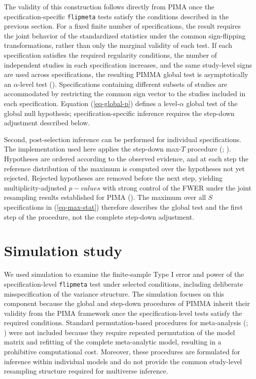 \documentclass[
  man,
  longtable,
  nolmodern,
  notxfonts,
  notimes,
  colorlinks=true,linkcolor=blue,citecolor=blue,urlcolor=blue]{apa7}
\begin{document}
The validity of this construction follows directly from PIMA once the
specification-specific \texttt{flipmeta} tests satisfy the conditions
described in the previous section. For a fixed finite number of
specifications, the result requires the joint behavior of the
standardized statistics under the common sign-flipping transformations,
rather than only the marginal validity of each test. If each
specification satisfies the required regularity conditions, the number
of independent studies in each specification increases, and the same
study-level signs are used across specifications, the resulting PIMMA
global test is asymptotically an \(\alpha\)-level test
(). Specifications
containing different subsets of studies are accommodated by restricting
the common sign vector to the studies included in each specification.
Equation (\ref{eq-global-p}) defines a level-\(\alpha\) global test of
the global null hypothesis; specification-specific inference requires
the step-down adjustment described below.

Second, post-selection inference can be performed for individual
specifications. The implementation used here applies the step-down
max-\(T\) procedure (; ). Hypotheses are ordered according to the observed evidence, and
at each step the reference distribution of the maximum is computed over
the hypotheses not yet rejected. Rejected hypotheses are removed before
the next step, yielding multiplicity-adjusted \(p-values\) with strong
control of the FWER under the joint resampling results established for
PIMA (). The maximum
over all \(S\) specifications in (\ref{eq-max-stat}) therefore describes
the global test and the first step of the procedure, not the complete
step-down adjustment.

\section{Simulation study}\label{simulation-study}

We used simulation to examine the finite-sample Type I error and power
of the specification-level \texttt{flipmeta} test under selected
conditions, including deliberate misspecification of the variance
structure. The simulation focuses on this component because the global
and step-down procedures of PIMMA inherit their validity from the PIMA
framework once the specification-level tests satisfy the required
conditions. Standard permutation-based procedures for meta-analysis
(;
) were not
included because they require repeated permutation of the model matrix
and refitting of the complete meta-analytic model, resulting in a
prohibitive computational cost. Moreover, these procedures are
formulated for inference within individual models and do not provide the
common study-level resampling structure required for multiverse
inference.
\end{document}
